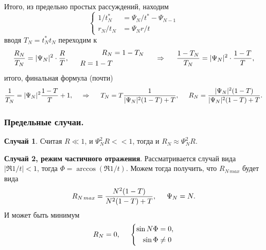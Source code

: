 Итого, из предельно простых рассуждений, находим
\begin{equation*}
    \left\{\begin{aligned}
        1/t_N^* &= \Psi_N / t^* - \Psi_{N-1} \\
        r_N / t_N &= \Psi_N r / t
    \end{aligned}\right.
\end{equation*}
вводя $T_N = t_N^* t_N$ переходим к 
\begin{equation*}
    \frac{R_N}{T_N} = |\Psi_N|^2 \cdot \frac{R}{T}, \hspace{5 mm} 
    \left.\begin{aligned}
        R_N &= 1 - T_N \\
        R = 1 - T \\
    \end{aligned}\right.
    \hspace{0.5cm} \Rightarrow \hspace{0.5cm}
    \frac{1-T_N}{T_N} = |\Psi_N|^2 \cdot \frac{1-T}{T},
\end{equation*}
итого, финальная формула (почти)
\begin{equation*}
    \frac{1}{T_N} = |\Psi_N|^2 \frac{1-T}{T} + 1,
    \hspace{0.5cm} \Rightarrow \hspace{0.5cm}
    T_N = T \frac{1}{|\Psi_N|^2 (1-T)+T},
    \hspace{5 mm} 
    R_N = \frac{|\Psi_N|^2 (1-T)}{|\Psi_N|^2 (1-T)+T}.
\end{equation*}





\subsubsection*{Предельные случаи.}


\textbf{ Случай 1}. Считая $R \ll 1$, и $\Psi_N^2 R << 1$, тогда и $R_N \approx \Psi_N^2 R$.


\textbf{ Случай 2, режим частичного отражения}. Рассматривается случай вида $|\Re 1/t| < 1$, тогда  $\Phi = \arccos\left(\Re 1/t\right)$. Можем тогда получить, что $R_{N\, max}$ будет вида
\begin{equation*}
    R_{N\, max} = \frac{N^2 (1-T)}{N^2 (1-T) + T}, \hspace{5 mm} \Psi_N = N.
\end{equation*}
И может быть минимум 
\begin{equation*}
    R_N = 0, \hspace{5 mm} \left\{\begin{aligned}
        \sin N \Phi &= 0, \\
        \sin \Phi &\neq 0
    \end{aligned}\right.
\end{equation*}



